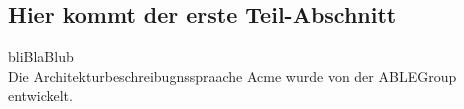 \label{Tim}
\subsection{Hier kommt der erste Teil-Abschnitt }
bliBlaBlub\\
Die Architekturbeschreibugnsspraache Acme wurde von der ABLEGroup \cite{ABLEGroupHomePage-2018-10-12} entwickelt.